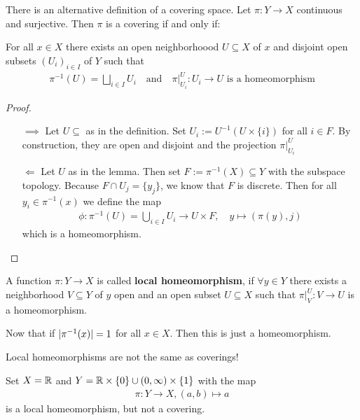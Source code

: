 \begin{lem}[]\label{lem:alt-covering}
There is an alternative definition of a covering space.
Let $\pi: Y \to X$ continuous and surjective. Then $\pi$ is a covering if and only if:

For all $x \in X$ there exists an open neighborhoood $U \subseteq X$ of $x$ and disjoint open subsets $(U_i)_{i\in I}$ of $Y$ such that
\begin{align*}
  \pi^{-1}(U) = \bigsqcup_{i \in I}U_i \quad \text{and} \quad \pi|_{U_i}^{U}: U_i \to U \text{ is a homeomorphism}
\end{align*}
\end{lem}
\begin{proof}
\begin{itemize}
  \item[$\implies$] Let $U \subseteq$ as in the definition. Set $U_i := U^{-1}(U \times \{i\})$ for all $i \in F$.
    By construction, they are open and disjoint and the projection $\pi|_{U_i}^{U}$ 
  \item[$\Leftarrow$] Let $U$ as in the lemma. Then set $F := \pi^{-1}(X) \subseteq Y$ with the subspace topology.
  Because $F \cap U_j = \{y_j\}$, we know that $F$ is discrete.
  Then for all $y_i \in \pi^{-1}(x)$ we define the map
  \begin{align*}
    \phi: \pi^{-1}(U) = \bigcup_{i \in I}U_i \to  U \times F, \quad y \mapsto (\pi(y),j)
  \end{align*}
  which is a homeomorphism.
\end{itemize}
\end{proof}

\begin{dfn}[]
A function $\pi: Y \to  X$ is called \textbf{local homeomorphism}, if
$\forall y \in Y$ there exists a neighborhood $V \subseteq Y$ of $y$ open and an open subset $U \subseteq X$ such that $\pi|_{V}^{U}: V \to  U$ is a homeomorphism.
\end{dfn}
Now that if $\vert\pi^{-1}(x)\vert = 1$ for all $x \in X$. Then this is just a homeomorphism.

Local homeomorphisms are not the same as coverings!
\begin{ex}[]
  Set $X = \mathbb{R}$ and $Y = \mathbb{R} \times \{0\} \cup (0,\infty) \times \{1\}$ with the map
  \begin{align*}
    \pi: Y \to  X, (a,b) \mapsto  a
  \end{align*}
  is a local homeomorphism, but not a covering.
\end{ex}

